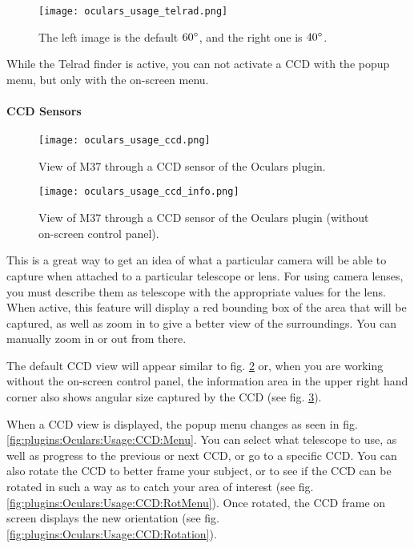 \begin{figure}[b]\centering
\texttt{[image: oculars\_usage\_telrad.png]}
\caption{The left image is the default $60\degree$, and the right one is $40\degree$.}
\label{fig:plugins:Oculars:Usage:Telrad}
\end{figure}

While the Telrad finder is active, you can not activate a CCD with the popup menu, but only with the on-screen menu.

\paragraph{CCD Sensors}


\begin{figure}[ht]\centering
\texttt{[image: oculars\_usage\_ccd.png]}
\caption{View of M37 through a CCD sensor of the Oculars plugin.}
\label{fig:plugins:Oculars:Usage:CCD}
\end{figure}

\begin{figure}[ht]\centering
\texttt{[image: oculars\_usage\_ccd\_info.png]}
\caption{View of M37 through a CCD sensor of the Oculars plugin (without on-screen control panel).}
\label{fig:plugins:Oculars:Usage:CCD:Info}
\end{figure}

\noindent This is a great way to get an idea of what a particular camera will be able to capture when attached to a particular telescope or lens. 
For using camera lenses, you must describe them as telescope with the appropriate values for the lens. 
When active, this feature will display a red bounding box of the area that will be captured, 
as well as zoom in to give a better view of the surroundings. You can manually zoom in or out from there.

The default CCD view will appear similar to fig. \ref{fig:plugins:Oculars:Usage:CCD} or, 
when you are working without the on-screen control panel, the information area in the upper right hand corner 
also shows angular size captured by the CCD (see fig. \ref{fig:plugins:Oculars:Usage:CCD:Info}).


When a CCD view is displayed, the popup menu changes  as seen in  fig. \ref{fig:plugins:Oculars:Usage:CCD:Menu}. 
You can select what telescope to use, as well as progress to the previous or next CCD, or go to a specific CCD. 
You can also rotate the CCD to better frame your subject, or to see if the CCD can be rotated in such a way as to 
catch your area of interest (see fig. \ref{fig:plugins:Oculars:Usage:CCD:RotMenu}). 
Once rotated, the CCD frame on screen displays the new orientation (see fig. \ref{fig:plugins:Oculars:Usage:CCD:Rotation}).

